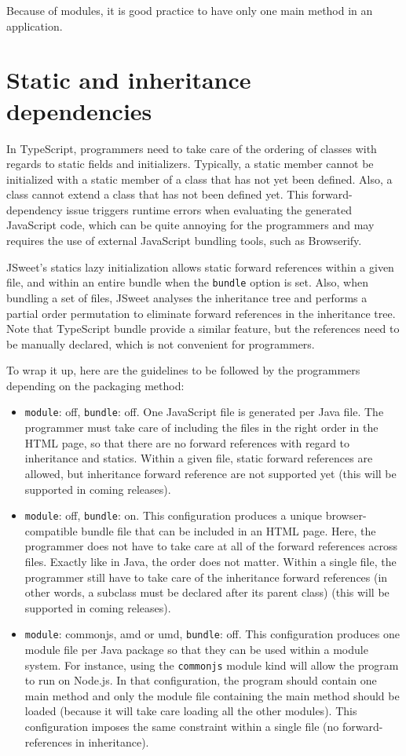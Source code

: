 \documentclass[a4paper]{report}
\begin{document}
Because of modules, it is good practice to have only one main method in an application.

\section*{Static and inheritance dependencies}

In TypeScript, programmers need to take care of the ordering of classes with regards to static fields and initializers. Typically, a static member cannot be initialized with a static member of a class that has not yet been defined. Also, a class cannot extend a class that has not been defined yet. This forward-dependency issue triggers runtime errors when evaluating the generated JavaScript code, which can be quite annoying for the programmers and may requires the use of external JavaScript bundling tools, such as Browserify.

JSweet's statics lazy initialization allows static forward references within a given file, and within an entire bundle when the \texttt{bundle} option is set. Also, when bundling a set of files, JSweet analyses the inheritance tree and performs a partial order permutation to eliminate forward references in the inheritance tree. Note that TypeScript bundle provide a similar feature, but the references need to be manually declared, which is not convenient for programmers.

To wrap it up, here are the guidelines to be followed by the programmers depending on the packaging method:

\begin{itemize}
\item \texttt{module}: off, \texttt{bundle}: off. One JavaScript file is generated per Java file. The programmer must take care of including the files in the right order in the HTML page, so that there are no forward references with regard to inheritance and statics. Within a given file, static forward references are allowed, but inheritance forward reference are not supported yet (this will be supported in coming releases). 
\item \texttt{module}: off, \texttt{bundle}: on. This configuration produces a unique browser-compatible bundle file that can be included in an HTML page. Here, the programmer does not have to take care at all of the forward references across files. Exactly like in Java, the order does not matter. Within a single file, the programmer still have to take care of the inheritance forward references (in other words, a subclass must be declared after its parent class) (this will be supported in coming releases).
\item \texttt{module}: commonjs, amd or umd, \texttt{bundle}: off. This configuration produces one module file per Java package so that they can be used within a module system. For instance, using the \texttt{commonjs} module kind will allow the program to run on Node.js. In that configuration, the program should contain one main method and only the module file containing the main method should be loaded (because it will take care loading all the other modules). This configuration imposes the same constraint within a single file (no forward-references in inheritance).
\end{itemize}
        
\end{document}
